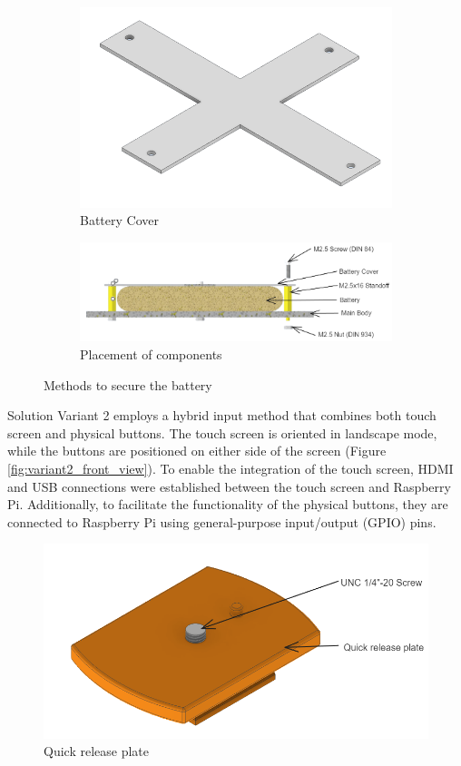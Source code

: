 \begin{figure}[h!]
    \centering
    \begin{subfigure}[c]{\textwidth}
        \begin{minipage}{\textwidth}
            \centering
            \includegraphics[height=4 cm]{texs/Part1/chapter4/image/v27.png}
        \end{minipage}
        \caption{Battery Cover}
        \label{fig:variant2_battery_cover}
    \end{subfigure}
    \begin{subfigure}[c]{\textwidth}
        \begin{minipage}{\textwidth}
            \centering
            \includegraphics[height=3 cm]{texs/Part1/chapter4/image/v28.png}
        \end{minipage}
        \caption{Placement of components}
        \label{fig:variant2_battery_placement}
    \end{subfigure}
    \caption{Methods to secure the battery}
    \label{fig:variant2_battery}
\end{figure}

Solution Variant 2 employs a hybrid input method that combines both touch screen and physical buttons. The touch screen is oriented in landscape mode, while the buttons are positioned on either side of the screen (Figure \ref{fig:variant2_front_view}). To enable the integration of the touch screen, HDMI and USB connections were established between the touch screen and Raspberry Pi. Additionally, to facilitate the functionality of the physical buttons, they are connected to Raspberry Pi using general-purpose input/output  (GPIO) pins.

\begin{figure}[ht!]
    \centering
    \includegraphics[height=5 cm]{texs/Part1/chapter4/image/v29.png}
    \caption{Quick release plate}
    \label{fig:variant2_quick_release_plate}
\end{figure}

